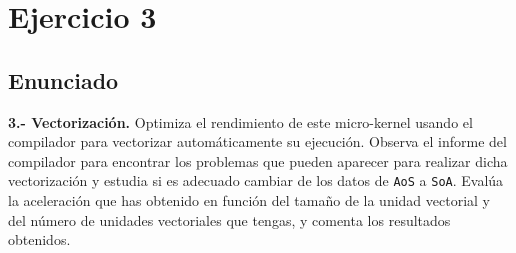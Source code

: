 \section{Ejercicio 3}
\subsection{Enunciado}
\begin{ejer}
    \textbf{3.- Vectorización.} Optimiza el rendimiento de este micro-kernel usando el compilador para vectorizar
    automáticamente su ejecución. Observa el informe del compilador para encontrar los problemas
    que pueden aparecer para realizar dicha vectorización y estudia si es adecuado cambiar de los
    datos de \texttt{AoS} a \texttt{SoA}. Evalúa la aceleración que has obtenido en función del tamaño de la unidad
    vectorial y del número de unidades vectoriales que tengas, y comenta los resultados obtenidos.
\end{ejer}
